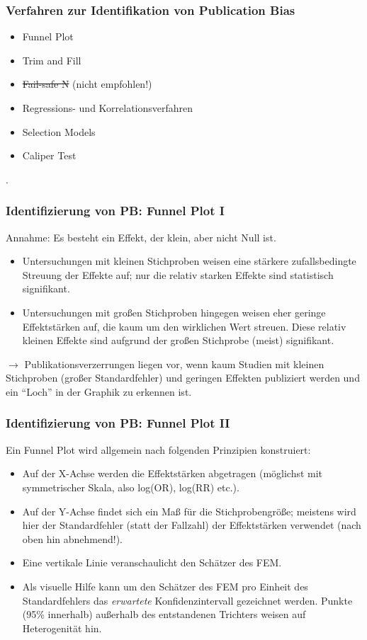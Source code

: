\begin{frame}
  \frametitle{Verfahren zur Identifikation von Publication Bias}

  \begin{itemize}
  \item Funnel Plot
  \item Trim and Fill
  \item \sout{Fail-safe N} (nicht empfohlen!)
  \item Regressions- und Korrelationsverfahren
  \item Selection Models
  \item Caliper Test
  \end{itemize}

  \citep[Quelle: Für eine ausführliche Diskussion der Vor- und Nachteile
  siehe][]{weis_identification_2011, auspurg_what_2011}.

\end{frame}


\begin{frame}
  \frametitle{Identifizierung von PB: Funnel Plot I}
  Annahme: Es besteht ein Effekt, der klein, aber nicht Null ist.
  \begin{itemize}
  \item Untersuchungen mit kleinen Stichproben weisen eine stärkere
    zufallsbedingte Streuung der Effekte auf; nur die relativ starken Effekte
    sind statistisch signifikant.
  \item Untersuchungen mit großen Stichproben hingegen weisen eher geringe
    Effektstärken auf, die kaum um den wirklichen Wert streuen. Diese relativ
    kleinen Effekte sind aufgrund der großen Stichprobe (meist) signifikant.
  \end{itemize}
  $\rightarrow$ Publikationsverzerrungen liegen vor, wenn kaum Studien
  mit kleinen Stichproben (großer Standardfehler) und geringen Effekten
  publiziert werden und ein "`Loch"' in der Graphik zu erkennen ist.
\end{frame}


\begin{frame}[plain]
  \frametitle{Identifizierung von PB: Funnel Plot II}
  Ein Funnel Plot wird allgemein nach folgenden Prinzipien konstruiert:
  \begin{itemize}
  \item Auf der X-Achse werden die Effektstärken abgetragen (möglichst mit
    symmetrischer Skala, also log(OR), log(RR) etc.).
  \item Auf der Y-Achse findet sich ein Maß für die Stichprobengröße; meistens
    wird hier der Standardfehler (statt der Fallzahl) der Effektstärken
    verwendet (nach oben hin abnehmend!).
  \item Eine vertikale Linie veranschaulicht den Schätzer des FEM.
  \item Als visuelle Hilfe kann um den Schätzer des FEM pro Einheit des
    Standardfehlers das \emph{erwartete} Konfidenzintervall gezeichnet
    werden. Punkte (95\% innerhalb) außerhalb des entstandenen Trichters weisen
    auf Heterogenität hin.
  \end{itemize}
\end{frame}


